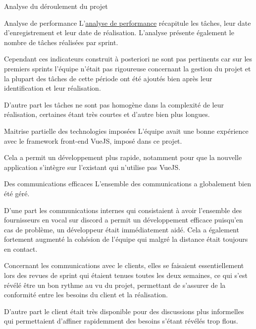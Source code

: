 \documentclass[]{article}
\begin{document}
{\begin{section}{Analyse du déroulement du projet}

 \begin{subsection}{Analyse de performance}
     L'\href{Analyse_de_performance.ods}{analyse de performance} récapitule les tâches, leur date d'enregistrement et leur date de réalisation. L'analyse présente également le nombre de tâches réalisées par sprint.

     Cependant ces indicateurs construit à posteriori ne sont pas pertinents car sur les premiers sprints l'équipe n'était pas rigoureuse concernant la gestion du projet et la plupart des tâches de cette période ont été ajoutés bien après leur identification et leur réalisation.

     D'autre part les tâches ne sont pas homogène dans la complexité de leur réalisation, certaines étant très courtes et d'autre bien plus longues.
 \end{subsection}

 \begin{subsection}{Maitrise partielle des technologies imposées }
     L'équipe avait une bonne expérience avec le framework front-end VueJS, imposé dans ce projet.

     Cela a permit un développement plus rapide, notamment pour que la nouvelle application s'intègre sur l'existant qui n'utilise pas VueJS.
 \end{subsection}

 \begin{subsection}{Des communications efficaces}
     L'ensemble des communications a globalement bien été géré.

     D'une part les communications internes qui consistaient à avoir l'ensemble des fournisseurs en vocal sur discord a permit un développement efficace puisqu'en cas de problème, un développeur était immédiatement aidé. Cela a également fortement augmenté la cohésion de l'équipe qui malgré la distance était toujours en contact.

     Concernant les communications avec le clients, elles se faisaient essentiellement lors des revues de sprint qui étaient tenues toutes les deux semaines, ce qui s'est révélé être un bon rythme au vu du projet, permettant de s'assurer de la conformité entre les besoins du client et la réalisation.

     D'autre part le client était très disponible pour des discussions plus informelles qui permettaient d'affiner rapidemment des besoins s'étant révélés trop flous.
 \end{subsection}


\end{section}}
\end{document}
